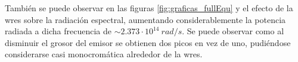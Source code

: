 También se puede observar en las figuras \ref{fig:graficas_fullEqu}  y  el efecto de la \gls{wres} sobre la radiación espectral, aumentando considerablemente la potencia radiada a dicha frecuencia de $\sim 2.373\cdot 10^{14} \ rad/s$. Se puede observar como al disminuir el grosor del emisor se obtienen dos picos en vez de uno, pudiéndose considerarse casi monocromática alrededor de la \gls{wres}.\\\\
\vfill

